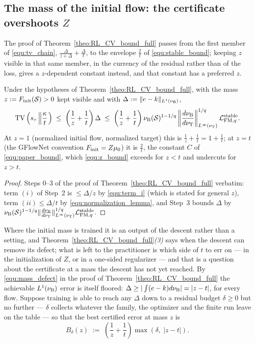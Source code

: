 \subsection{The mass of the initial flow: the certificate overshoots $Z$}\label{sec:mass}

The proof of Theorem~\ref{theo:RL_CV_bound_full} passes from the first member of
\eqref{equ:tv_chain}, $\frac{\Delta}{z+\Delta}+\frac{\Delta}{t}$, to the envelope $\frac2t$
of \eqref{equ:stable_bound}; keeping $z$ visible in that same member, in the currency of the
residual rather than of the loss, gives a $z$-dependent constant instead, and that constant
has a preferred $z$.

\begin{proposition}\label{prop:z_bound}
Under the hypotheses of Theorem~\ref{theo:RL_CV_bound_full}, with the mass
$z:=F_{\mathrm{init}}(\mathcal S)>0$ kept visible and with $\Delta:=\|e-k\|_{L^1(\nu_{\mathrm{B}})}$,
\begin{equation}\label{equ:z_bound}
    \mathrm{TV}\left(s_\tau\left\|\frac{\kappa}{t}\right.\right)\;\leq\;
    \left(\frac1z+\frac1t\right)\Delta\;\leq\;
    \left(\frac1z+\frac1t\right)
    \nu_{\mathrm{B}}(\mathcal S)^{1-1/q}\left\|\frac{d\nu_{\mathrm{B}}}{d\nu_{\mathrm{T}}}\right\|^{1/q}_{L^\infty(\nu_{\mathrm{T}})}\mathcal L_{\mathrm{FM},q}^{\mathrm{stable}} .
\end{equation}
At $z=1$ (normalized initial flow, normalized target) this is $\frac1z+\frac1t=1+\frac1t$;
at $z=t$ (the GFlowNet convention $F_{\mathrm{init}}=Z\mu_0$) it is $\frac2t$, the constant $C$ of
\eqref{equ:paper_bound}, which \eqref{equ:z_bound} exceeds for $z<t$ and undercuts for
$z>t$.
\end{proposition}

\begin{proof}
Steps 0--3 of the proof of Theorem~\ref{theo:RL_CV_bound_full} verbatim: term $(i)$ of
Step~2 is $\leq\Delta/z$ by \eqref{equ:term_i} (which is stated for general $z$), term
$(ii)\leq\Delta/t$ by \eqref{equ:normalization_lemma}, and Step~3 bounds $\Delta$ by
$\nu_{\mathrm{B}}(\mathcal S)^{1-1/q}\|\frac{d\nu_{\mathrm{B}}}{d\nu_{\mathrm{T}}}\|^{1/q}_{L^\infty(\nu_{\mathrm{T}})}\mathcal L_{\mathrm{FM},q}^{\mathrm{stable}}$.
\end{proof}

Where the initial mass is trained it is an output of the descent rather than a setting, and
Theorem~\ref{theo:RL_CV_bound_full}\emph{(3)} says when the descent can remove its defect;
what is left to the practitioner is which side of $t$ to err on --- in the initialization of
$Z$, or in a one-sided regularizer --- and that is a question about the certificate at a mass
the descent has not yet reached. By \eqref{equ:mass_defect} in the proof of
Theorem~\ref{theo:RL_CV_bound_full} the achievable $L^1(\nu_{\mathrm{B}})$ error is itself floored:
$\Delta\geq|\int(e-k)d\nu_{\mathrm{B}}|=|z-t|$, for every flow. Suppose training is able to reach
any $\Delta$ down to a residual budget $\delta\geq0$ but no further --- $\delta$ collects
whatever the family, the optimizer and the finite run leave on the table --- so that the
best certified error at mass $z$ is
\begin{equation}\label{equ:envelope}
    B_\delta(z)\;:=\;\left(\frac1z+\frac1t\right)\max\left(\delta,\;|z-t|\right).
\end{equation}

